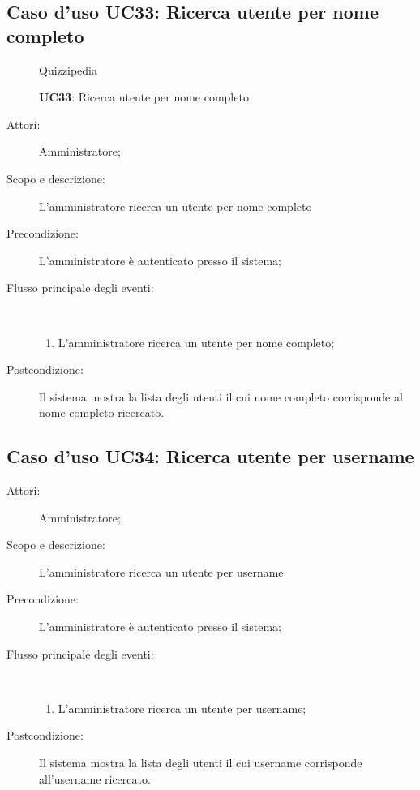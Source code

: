 \subsection{Caso d'uso UC33: Ricerca utente per nome completo}
	\begin{figure}[H]
		\centering
		\begin{resizedtikzpicture}{\textwidth}
		\begin{umlsystem}[x=0, fill=lightgray!20]{Quizzipedia}
		\end{umlsystem}
		\end{resizedtikzpicture}
		\caption{\textbf{UC33}: Ricerca utente per nome completo}
		\label{UC33}
	\end{figure}
\begin{description}
\item[Attori:] Amministratore;
\item[Scopo e descrizione:] L'amministratore ricerca un utente per nome completo
      \item[Precondizione:] L'amministratore è autenticato presso il sistema;

        \item[Flusso principale degli eventi:] \ 
 \begin{enumerate}
          \item L'amministratore ricerca un utente per nome completo;

      \end{enumerate}
    \item[Postcondizione:] Il sistema mostra la lista degli utenti il cui nome completo corrisponde al nome completo ricercato.
  \end{description}
\hypertarget{UC34}{}
\subsection{Caso d'uso UC34: Ricerca utente per username}\begin{description}
\item[Attori:] Amministratore;
\item[Scopo e descrizione:] L'amministratore ricerca un utente per username
      \item[Precondizione:] L'amministratore è autenticato presso il sistema;

        \item[Flusso principale degli eventi:] \ 
 \begin{enumerate}
          \item L'amministratore ricerca un utente per username;

      \end{enumerate}
    \item[Postcondizione:] Il sistema mostra la lista degli utenti il cui username corrisponde all'username ricercato.
  \end{description}
\hypertarget{UC35}{}
